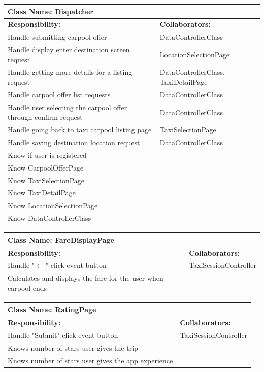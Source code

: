 \documentclass[]{article}
\begin{document}
	\begin{table}[H]
	\centering
	\begin{tabular}{|p{6cm}|p{6cm}|}
	\hline 
		\multicolumn{2}{|l|}{\textbf{Class Name: Dispatcher}} \\
	\hline
	\textbf{Responsibility:} & \textbf{Collaborators:} \\
	\hline
	Handle submitting carpool offer & DataControllerClass\\ \hline
	Handle display enter destination screen request & LocationSelectionPage\\ \hline
	Handle getting more details for a listing request & DataControllerClass, TaxiDetailPage\\ \hline
	Handle carpool offer list requests & DataControllerClass\\ \hline
	Handle user selecting the carpool offer through confirm request & DataControllerClass\\ \hline 
	Handle going back to taxi carpool listing page & TaxiSelectionPage\\ \hline
	Handle saving destination location request & DataControllerClass\\ \hline
	Know if user is registered & \\ \hline
	Know CarpoolOfferPage & \\ \hline 
	Know TaxiSelectionPage & \\ \hline
	Know TaxiDetailPage & \\ \hline
	Know LocationSelectionPage & \\ \hline
	Know DataControllerClass & \\ \hline
	\end{tabular}
	\end{table}
	
	\begin{table}[H]
	\centering
	\begin{tabular}{|p{6cm}|p{6cm}|}
	\hline 
		\multicolumn{2}{|l|}{\textbf{Class Name: FareDisplayPage}} \\
	\hline
	\textbf{Responsibility:} & \textbf{Collaborators:} \\
	\hline
	Handle "$\xleftarrow{}$" click event button & TaxiSessionController \\ \hline
	Calculates and displays the fare for the user when carpool ends & \\ \hline
	\end{tabular}
	\end{table}
	
	\begin{table}[H]
	\centering
	\begin{tabular}{|p{6cm}|p{6cm}|}
	\hline 
		\multicolumn{2}{|l|}{\textbf{Class Name: RatingPage}} \\
	\hline
	\textbf{Responsibility:} & \textbf{Collaborators:} \\
	\hline
	Handle "Submit" click event button & TaxiSessionController \\ \hline
	Knows number of stars user gives the trip & \\ \hline
	Knows number of stars user gives the app experience & \\ \hline
	\end{tabular}
	\end{table}
	
\end{document}
